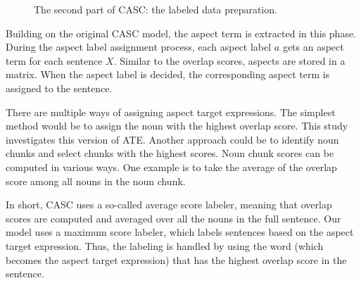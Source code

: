 \documentclass[american, oneside]{ecsgdp}
\begin{document}
\begin{figure}[htbp]
  \centering
  
  \caption{The second part of CASC: the labeled data preparation.}
  \label{fig:casc2}
\end{figure}

Building on the original CASC model, the aspect term is extracted in this phase. During the aspect label assignment process, each aspect label $a$ gets an aspect term for each sentence $X$. Similar to the overlap scores, aspects are stored in a matrix. When the aspect label is decided, the corresponding aspect term is assigned to the sentence.

There are multiple ways of assigning aspect target expressions. The simplest method would be to assign the noun with the highest overlap score. This study investigates this version of ATE. Another approach could be to identify noun chunks \parencite{Honnibal2020Spacy} and select chunks with the highest scores. Noun chunk scores can be computed in various ways. One example is to take the average of the overlap score among all nouns in the noun chunk. 

In short, CASC uses a so-called average score labeler, meaning that overlap scores are computed and averaged over all the nouns in the full sentence. Our model uses a maximum score labeler, which labels sentences based on the aspect target expression. Thus, the labeling is handled by using the word (which becomes the aspect target expression) that has the highest overlap score in the sentence.


\end{document}

